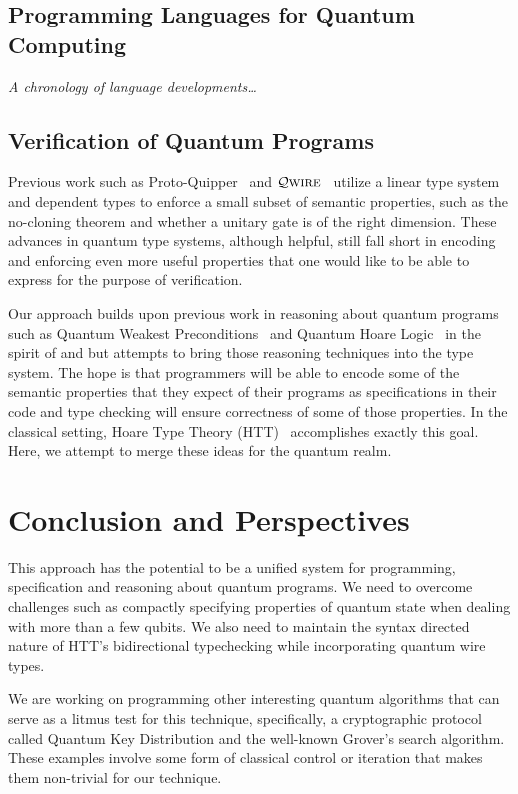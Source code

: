 \documentclass[acmsmall,nonacm,timestamp]{acmart}
\newcommand{\qwire}{\ensuremath{\mathcal{Q}\textsc{wire}}\xspace}
\begin{document}
\subsection{Programming Languages for Quantum Computing}
\textit{A chronology of language developments\ldots}

\subsection{Verification of Quantum Programs}
Previous work such as Proto-Quipper~\cite{ross_algebraic_2015,mahmoud_formalization_2019,rios_categorical_2017} and \qwire~\cite{paykin_qwire:_2017,rand_qwire_2017,rand_formally_2018} utilize a linear type system and dependent types to enforce a small subset of semantic properties, such as the no-cloning theorem and whether a unitary gate is of the right dimension. These advances in quantum type systems, although helpful, still fall short in encoding and enforcing even more useful properties that one would like to be able to express for the purpose of verification.

Our approach builds upon previous work in reasoning about quantum programs such as Quantum Weakest Preconditions~\cite{dhondt_quantum_2006} and Quantum Hoare Logic~\cite{ying_floydhoare_2012} in the spirit of \citet{hoare_axiomatic_1969} and \citet{dijkstra_discipline_1976} but attempts to bring those reasoning techniques into the type system. The hope is that programmers will be able to encode some of the semantic properties that they expect of their programs as specifications in their code and type checking will ensure correctness of some of those properties. In the classical setting, Hoare Type Theory (HTT)~\cite{nanevski_hoare_2008} accomplishes exactly this goal. Here, we attempt to merge these ideas for the quantum realm.

\section{Conclusion and Perspectives}
This approach has the potential to be a unified system for programming, specification and reasoning about quantum programs. We need to overcome challenges such as compactly specifying properties of quantum state when dealing with more than a few qubits. We also need to maintain the syntax directed nature of HTT's bidirectional typechecking while incorporating quantum wire types.

We are working on programming other interesting quantum algorithms that can serve as a litmus test for this technique, specifically, a cryptographic protocol called Quantum Key Distribution and the well-known Grover's search algorithm. These examples involve some form of classical control or iteration that makes them non-trivial for our technique.
\end{document}
